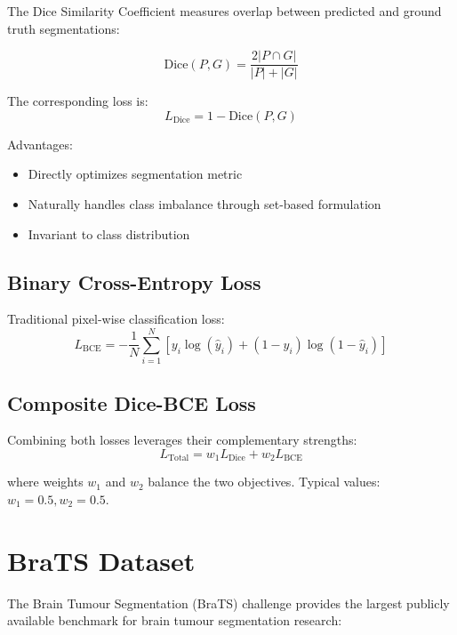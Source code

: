\documentclass{ecsproject}     %
\begin{document}
The Dice Similarity Coefficient measures overlap between predicted and ground truth segmentations:

\begin{equation}
\text{Dice}(P, G) = \frac{2|P \cap G|}{|P| + |G|}
\end{equation}

The corresponding loss is:
\begin{equation}
L_{\text{Dice}} = 1 - \text{Dice}(P, G)
\end{equation}

Advantages:
\begin{itemize}
    \item Directly optimizes segmentation metric
    \item Naturally handles class imbalance through set-based formulation
    \item Invariant to class distribution
\end{itemize}

\subsection{Binary Cross-Entropy Loss}

Traditional pixel-wise classification loss:
\begin{equation}
L_{\text{BCE}} = -\frac{1}{N} \sum_{i=1}^{N} [y_i \log(\hat{y}_i) + (1-y_i) \log(1-\hat{y}_i)]
\end{equation}

\subsection{Composite Dice-BCE Loss}

Combining both losses leverages their complementary strengths:
\begin{equation}
L_{\text{Total}} = w_1 L_{\text{Dice}} + w_2 L_{\text{BCE}}
\end{equation}

where weights $w_1$ and $w_2$ balance the two objectives. Typical values: $w_1 = 0.5, w_2 = 0.5$.

\section{BraTS Dataset}

The Brain Tumour Segmentation (BraTS) challenge \cite{Menze2015} provides the largest publicly available benchmark for brain tumour segmentation research:
\end{document}
